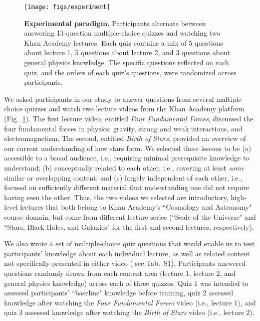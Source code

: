 \documentclass[10pt]{article}
\newcommand{\questions}{S1}
\begin{document}
\begin{figure}[tp]
    \centering
    \texttt{[image: figs/experiment]}

    \caption{\textbf{Experimental paradigm.} Participants alternate between
    answering 13-question multiple-choice quizzes and watching two Khan Academy
    lectures. Each quiz contains a mix of 5 questions about lecture 1, 5
    questions about lecture 2, and 3 questions about general physics knowledge. The
    specific questions reflected on each quiz, and the orders of each quiz's
    questions, were randomized across participants.}

    \label{fig:experiment}
\end{figure}

We asked participants in our study to answer questions from several multiple-choice
quizzes and watch two lecture videos from the Khan Academy platform
(Fig.~\ref{fig:experiment}). The first lecture video, entitled \textit{Four
Fundamental Forces}, discussed the four fundamental forces in physics: gravity,
strong and weak interactions, and electromagnetism. The second,
entitled \textit{Birth of Stars}, provided an overview of our current
understanding of how stars form. We selected these lessons to be (a) accessible
to a broad audience, i.e., requiring minimal prerequisite knowledge to understand;
(b) conceptually related to each other, i.e., covering at least \textit{some}
similar or overlapping content; and (c) largely independent of each other, i.e., focused
on sufficiently different material that understanding one did not require having seen
the other. Thus, the two videos we selected are introductory, high-level lectures that both 
belong to Khan Academy's ``Cosmology and Astronomy" course domain, but come from
different lecture series (``Scale of the Universe" and ``Stars, Black Holes, and Galaxies" 
for the first and second lectures, respectively). 

We also wrote a set of
multiple-choice quiz questions that would enable us to test participants'
knowledge about each individual lecture, as well as related content not
specifically presented in either video ( see Tab.~\questions). Participants answered
questions randomly drawn from each content area (lecture 1, lecture 2, and
general physics knowledge) across each of three quizzes. Quiz 1 was intended to
assessed participants' ``baseline" knowledge before training, quiz 2 assessed knowledge
after watching the \textit{Four Fundamental Forces} video (i.e., lecture 1),
and quiz 3 assessed knowledge after watching the \textit{Birth of Stars} video
(i.e., lecture 2).
\end{document}
